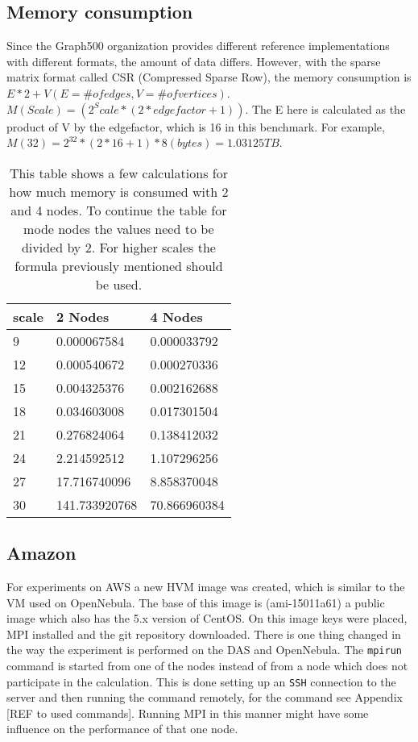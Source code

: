 \subsection{Memory consumption}
Since the Graph500 organization provides different reference implementations with different formats, the amount of data differs. However, with the sparse matrix format called CSR (Compressed Sparse Row), the memory consumption is $E*2 + V (E = \# of edges, V = \# of vertices)$.
$M(Scale) = (2^Scale *(2*edgefactor + 1))$. The E here is calculated as the product of V by the edgefactor, which is 16 in this benchmark. For
example, $M(32) = 2^32 * (2*16+1) * 8 (bytes) = 1.03125 TB$.
\begin{table} [!h]
\begin{tabular}{|l|l|l|}
\hline
scale & 2 Nodes& 4 Nodes \\ \hline
9 & 0.000067584	&	0.000033792 \\ \hline
12 & 0.000540672	&	0.000270336\\ \hline
15 & 0.004325376	&	0.002162688\\ \hline
18 & 0.034603008	&	0.017301504\\ \hline
21 & 0.276824064	&	0.138412032\\ \hline
24 & 2.214592512	&	1.107296256\\ \hline
27 & 17.716740096	&	8.858370048\\ \hline
30 & 141.733920768	&	70.866960384\\ \hline


\end{tabular}
\caption{This table shows a few calculations for how much memory is consumed with 2 and 4 nodes. To continue the table for mode nodes the values need to be divided by 2. For higher scales the formula previously mentioned should be used.}
\label{tab:calculation memory consumption}
\end{table}
    
\subsection{Amazon}
For experiments on AWS a new HVM image was created, which is similar to the VM used on OpenNebula. The base of this image is (ami-15011a61) a public image which also has the 5.x version of CentOS. On this image keys were placed, MPI installed and the git repository downloaded. There is one thing changed in the way the experiment is performed on the DAS and OpenNebula. The \texttt{mpirun} command is started from one of the nodes instead of from a node which does not participate in the calculation. This is done setting up an \texttt{SSH} connection to the server and then running the command remotely, for the command see Appendix [REF to used commands]. Running MPI in this manner might have some influence on the performance of that one node.
